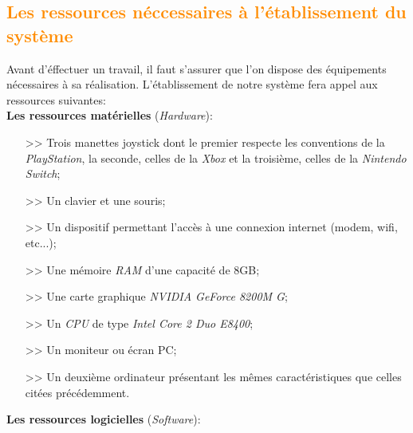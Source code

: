 \documentclass[ebook, 8pt, oneside, openany]{memoir}
\begin{document}
	\subsection{\textcolor{darkorange}{Les ressources néccessaires à l'établissement du système}}
	Avant d'éffectuer un travail, il faut s'assurer que l'on dispose des équipements nécessaires à sa
	réalisation. L'établissement de notre système fera appel aux ressources suivantes:\\
	\textbf{Les ressources matérielles} (\textit{Hardware}):
	\begin{itemize}
		\item[>>] Trois manettes joystick dont le premier respecte les conventions de la \emph{PlayStation},
		la seconde, celles de la \textit{Xbox} et la troisième, celles de la \textit{Nintendo Switch};
		\item[>>] Un clavier et une souris;
		\item[>>] Un dispositif permettant l'accès à une connexion internet (modem, wifi, etc...);
		\item[>>] Une mémoire \textit{RAM} d'une capacité de 8GB;
		\item[>>] Une carte graphique \textit{NVIDIA GeForce 8200M G};
		\item[>>] Un \textit{CPU} de type \textit{Intel Core 2 Duo E8400};
		\item[>>] Un moniteur ou écran PC;
		\item[>>] Un deuxième ordinateur présentant les mêmes caractéristiques que celles citées
		précédemment.
	\end{itemize}
	\textbf{Les ressources logicielles} (\textit{Software}):
\end{document}
